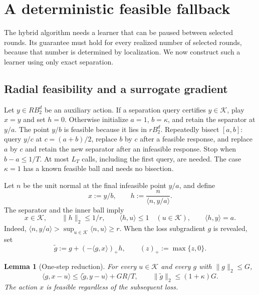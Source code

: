\documentclass[11pt]{article}
\newcommand{\K}{\mathcal K}
\newcommand{\ip}[2]{\langle #1,#2\rangle}
\newcommand{\norm}[1]{\lVert #1\rVert}
\newtheorem{lemma}[lemma]{Lemma}
\theoremstyle{definition}
\newcounter{algorithm}
\begin{document}
\section{A deterministic feasible fallback}\label{sec:backup}

The hybrid algorithm needs a learner that can be paused between selected
rounds. Its guarantee must hold for every realized number of selected rounds,
because that number is determined by localization. We now construct such a
learner using only exact separation.

\subsection{Radial feasibility and a surrogate gradient}

Let $y\in RB_2^d$ be an auxiliary action. If a separation query certifies
$y\in\K$, play $x=y$ and set $h=0$. Otherwise initialize $a=1$, $b=\kappa$,
and retain the separator at $y/a$. The point $y/b$ is feasible because it
lies in $rB_2^d$. Repeatedly bisect $[a,b]$: query $y/c$ at
$c=(a+b)/2$, replace $b$ by $c$ after a feasible response, and replace $a$
by $c$ and retain the new separator after an infeasible response. Stop when
$b-a\le1/T$. At most $L_T$ calls, including the first query, are needed.
The case $\kappa=1$ has a known feasible ball and needs no bisection.

Let $n$ be the unit normal at the final infeasible point $y/a$, and define
\begin{equation}\label{eq:polar}
 x:=y/b,
 \qquad h:=\frac{n}{\ip{n}{y/a}}.
\end{equation}
The separator and the inner ball imply
\begin{equation}\label{eq:polar-properties}
 x\in\K,\qquad
 \norm{h}_2\le1/r,\qquad
 \ip{h}{u}\le1\quad(u\in\K),\qquad
 \ip{h}{y}=a.
\end{equation}
Indeed, $\ip{n}{y/a}>\sup_{u\in\K}\ip{n}{u}\ge r$.
When the loss subgradient $g$ is revealed, set
\begin{equation}\label{eq:surrogate}
 \widetilde g:=g+(-\ip{g}{x})_+h,
 \qquad (z)_+:=\max\{z,0\}.
\end{equation}

\begin{lemma}[One-step reduction]\label{lem:radial}
For every $u\in\K$ and every $g$ with $\norm{g}_2\le G$,
\begin{equation}\label{eq:radial}
 \ip{g}{x-u}\le\ip{\widetilde g}{y-u}+GR/T,
 \qquad
 \norm{\widetilde g}_2\le(1+\kappa)G.
\end{equation}
The action $x$ is feasible regardless of the subsequent loss.
\end{lemma}
\end{document}
